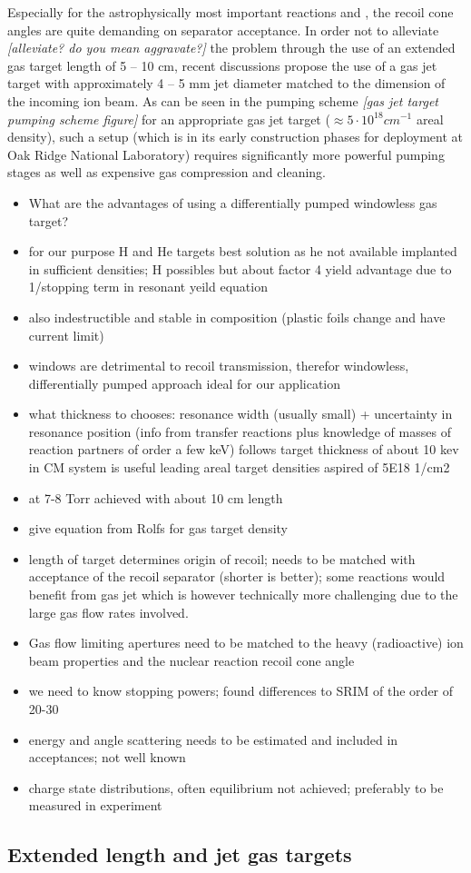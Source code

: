Especially for the astrophysically most important reactions \reac{\alpha}{\gamma} and \reac{\alpha}{\gamma}, the recoil cone angles are quite demanding on separator acceptance. In order not to alleviate \emph{[alleviate? do you mean aggravate?]} the problem through the use of an extended gas target length of 5 -- 10 cm, recent discussions propose the use of a gas jet target with approximately 4 -- 5 mm jet diameter matched to the dimension of the incoming ion beam. As can be seen in the pumping scheme \emph{[gas jet target pumping scheme figure]} for an appropriate gas jet target ($\approx 5\cdot10^{18} \unit{cm^{-1}}$ areal density), such a setup (which is in its early construction phases for deployment at Oak Ridge National Laboratory) requires significantly more powerful pumping stages as well as expensive gas compression and cleaning.\\
 

\small
\begin{itemize} 
\item What are the advantages of using a differentially pumped windowless gas target?
\item for our purpose H and He targets best solution as he not available implanted in sufficient densities; H possibles but about factor 4 yield advantage due to 1/stopping term in resonant yeild equation
\item also indestructible and stable in composition (plastic foils change and have current limit)
\item windows are detrimental to recoil transmission, therefor windowless, differentially pumped approach ideal for our application
\item what thickness to chooses: resonance width (usually small) + uncertainty in resonance position (info from transfer reactions plus knowledge of masses of reaction partners of order a few keV) follows target thickness of about 10 kev in CM system is useful leading areal target densities aspired of 5E18 1/cm2
\item at 7-8 Torr achieved with about 10 cm length
\item give equation from Rolfs for gas target density
\item  length of target determines origin of recoil; needs to be matched with acceptance of the recoil separator (shorter is better); some reactions would benefit from gas jet which is however technically more challenging due to the large gas flow rates involved.
\item Gas flow limiting apertures need to be matched to the heavy (radioactive) ion beam properties and the nuclear reaction recoil cone angle
\item we need to know stopping powers; found differences to SRIM of the order of 20-30%
\item energy and angle scattering needs to be estimated and included in acceptances; not well known
\item charge state distributions, often equilibrium not achieved; preferably to be measured in experiment
\end{itemize}
\normalsize


\subsection{Extended length and jet gas targets}

